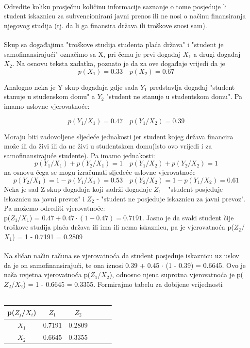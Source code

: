 \documentclass[12pt]{article}
\begin{document}
\begin{enumerate}
\\
Odredite koliku prosječnu količinu informacije saznanje o tome posjeduje li student iskaznicu za subvencionirani javni prenos ili ne nosi o načinu finansiranja njegovog studija (tj. da li ga finansira država ili troškove snosi sam). \\
\\

 Skup sa događajima "troškove studija studenta plaća država" i "student je samofinansirajući" označimo sa X, pri čemu je prvi događaj $X_1$ a drugi događaj $X_2$. Na osnovu teksta zadatka,
poznato je da za ove događaje vrijedi da je 
\begin{equation*}
    p(X_1) = 0.33 \quad p(X_2) = 0.67
\end{equation*}

Analogno neka je Y skup događaja gdje sada $Y_1$ predstavlja događaj "student stanuje u studenskom domu" a $Y_2$ "student ne stanuje u studentskom domu". Pa imamo uslovne vjerovatnoće:

\begin{equation*}
    p(Y_1/X_1) = 0.47 \quad p(Y_1/X_2) = 0.39
\end{equation*}
		
Moraju biti zadovoljene sljedeće jednakosti jer student kojeg država financira može ili da živi ili da ne živi u studentskom domu(isto ovo vrijedi i za samofinansirajuće studente). Pa imamo jednakosti:
\begin{equation*}
    p(Y_1/X_1) + p(Y_2/X_1) = 1 \quad p(Y_1/X_2) + p(Y_2/X_2) = 1
\end{equation*}
na osnovu čega se mogu izračunati sljedeće uslovne vjerovatnoće
\begin{equation*}
    p(Y_2/X_1) = 1 - p(Y_1/X_1) = 0.53 \quad p(Y_2/X_2) = 1 - p(Y_1/X_2) = 0.61
\end{equation*}
Neka je sad Z skup događaja koji sadrži događaje $Z_1$ - "student posjeduje iskaznicu za javni prevoz" i $Z_2$ - "student ne posjeduje iskaznicu za javni prevoz".
Pa možemo odrediti vjerovatnoće: \\
p($Z_1$/$X_1$) = $0.47 + 0.47\cdot(1 - 0.47) = 0.7191$.  Jasno je da svaki student čije troškove studija plaća
država ili ima ili nema iskaznicu, pa je vjerovatnoća p($Z_2$/$X_1$) = 1 - 0.7191 = 0.2809
\\
\\
Na sličan način računa se vjerovatnoća da student posjeduje iskaznicu uz uslov da je on samofinansirajući, te ona iznosi 0.39 + 0.45 ${\cdot}$ (1 - 0.39) = 0.6645. Ovo je naša uvjetna vjerovatnoća p($Z_1$/$X_2$), odnosno njena suprotna vjerovatnoća je p($Z_2$/$X_2$) = 1 - 0.6645 = 0.3355. Formirajmo tabelu za dobijene vrijednosti \\
\\
\begin{tabular}{|c|c|c|c|c|c|}
\hline
p(${Z_j}$/${X_i}$) & ${Z_1}$   &  ${Z_2}$ \\ \hline
${X_1}$                           & 0.7191  & 0.2809 \\ \hline
${X_2}$                          & 0.6645 & 0.3355 \\ \hline
\end{tabular} \\


\end{enumerate}
\end{document}
